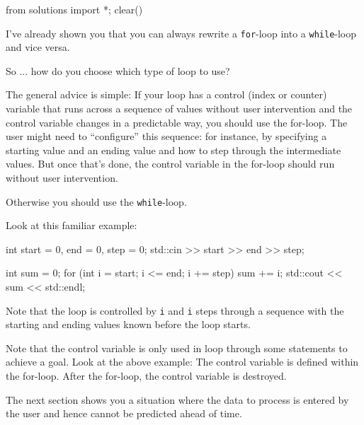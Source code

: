\begin{python0}
from solutions import *; clear()
\end{python0}

I've already shown you that you can always rewrite a \texttt{for}-loop into a \texttt{while}-loop and vice versa.

So ... how do you choose which type of loop to use?

The general advice is simple: If your loop has a control (index or
counter) variable that runs across a sequence of values without user
intervention and the control variable changes in a predictable way, you
should use the for-loop. The user might need to ``configure'' this
sequence: for instance, by specifying a starting value and an ending
value and how to step through the intermediate values. But once
that's done, the control variable in the for-loop should
run without user intervention.

Otherwise you should use the \texttt{while}-loop.

Look at this familiar example:
\begin{console}
int start = 0, end = 0, step = 0;
std::cin >> start >> end >> step;

int sum = 0;
for (int i = start; i <= end; i += step)
{   
    sum += i;
}
std::cout << sum << std::endl; 
\end{console}

Note that the loop is controlled by \texttt{i} and \texttt{i} steps through
a sequence with the starting and ending values known before the loop
starts.

Note that the control variable is only used in loop through some
statements to achieve a goal. Look at the above example: The control
variable is defined within the for-loop. After the for-loop, the control
variable is destroyed.

The next section shows you a situation where the data to process is
entered by the user and hence cannot be predicted ahead of time.

